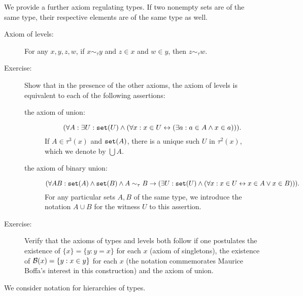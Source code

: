\documentclass[12pt]{book}
\begin{document}
We provide a further axiom regulating types.  If two nonempty sets are of the same type, their respective elements are of the same type as well.

\begin{description}

\item[Axiom of levels:]  For any $x,y,z,w$, if $x \sim_\tau y$ and $z \in x$ and $w \in y$, then $z \sim_\tau w$.

\item[Exercise:]  Show that in the presence of the other axioms, the axiom of levels is equivalent to each of the following assertions:

\begin{description}

\item  [the axiom of union:]  $$(\forall A:\exists U:{\tt set}(U) \wedge (\forall x:x \in U \leftrightarrow (\exists a:a \in A \wedge x \in a))).$$  If $A \in \tau^3(x)$ and ${\tt set}(A)$,
there is a unique such $U$ in $\tau^2(x)$, which we denote by $\bigcup A$.

\item[the axiom of binary union:]  $$(\forall AB: {\tt set}(A) \wedge {\tt set}(B) \wedge A \sim_\tau B \rightarrow (\exists U:{\tt set}(U) \wedge (\forall x:x \in U \leftrightarrow x \in A \vee x \in B))).$$  For any particular sets $A,B$ of the same type, we introduce the notation $A \cup B$ for the witness $U$ to this assertion.

\end{description}

\item[Exercise:]  Verify that the axioms of types and levels both follow if one postulates the existence of $\{x\} = \{y:y=x\}$ for each $x$ (axiom of singletons), the existence of
${\cal B}(x) = \{y:x\in y\}$ for each $x$ (the notation commemorates Maurice Boffa's interest in this construction) and the axiom of union.

\end{description}

We consider notation for hierarchies of types.
\end{document}
